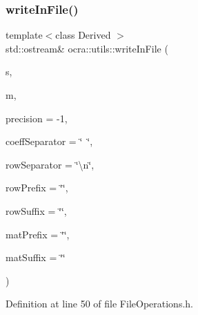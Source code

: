 \subsubsection{\texorpdfstring{write\+In\+File()}{writeInFile()}\hspace{0.1cm}{\footnotesize\ttfamily [2/3]}}
{\footnotesize\ttfamily template$<$class Derived $>$ \\
std\+::ostream\& ocra\+::utils\+::write\+In\+File (\begin{DoxyParamCaption}\item[{std\+::ostream \&}]{s,  }\item[{const Matrix\+Base$<$ Derived $>$ \&}]{m,  }\item[{int}]{precision = {\ttfamily -\/1},  }\item[{const std\+::string \&}]{coeff\+Separator = {\ttfamily \char`\"{}~\char`\"{}},  }\item[{const std\+::string \&}]{row\+Separator = {\ttfamily \char`\"{}\textbackslash{}n\char`\"{}},  }\item[{const std\+::string \&}]{row\+Prefix = {\ttfamily \char`\"{}\char`\"{}},  }\item[{const std\+::string \&}]{row\+Suffix = {\ttfamily \char`\"{}\char`\"{}},  }\item[{const std\+::string \&}]{mat\+Prefix = {\ttfamily \char`\"{}\char`\"{}},  }\item[{const std\+::string \&}]{mat\+Suffix = {\ttfamily \char`\"{}\char`\"{}} }\end{DoxyParamCaption})\hspace{0.3cm}{\ttfamily [inline]}}



Definition at line 50 of file File\+Operations.\+h.

\hypertarget{namespaceocra_1_1utils_af94bc08a67cf20092611bb37f4528b28}{}\label{namespaceocra_1_1utils_af94bc08a67cf20092611bb37f4528b28} 
